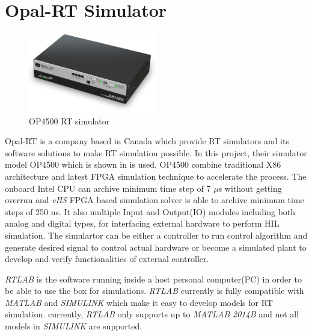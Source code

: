 \section{Opal-RT Simulator}
\begin{figure}[b]
     \centering
     \includegraphics[width = 0.5\textwidth]{figures/op4500.jpg}
     \caption{OP4500 \gls{RT} simulator}
     \label{fig:op4500}
\end{figure}
Opal-RT is a company based in Canada which provide \gls{RT} simulators and its software solutions to make \gls{RT} simulation possible. In this project, their simulator model OP4500 which is shown in  is used. OP4500 combine traditional X86 architecture and latest \gls{FPGA} simulation technique to accelerate the process. The onboard Intel CPU can archive minimum time step of 7 $\mu
$s without getting overrun and \textit{eHS} \gls{FPGA} based simulation solver is able to archive minimum time steps of 250 ns. It also multiple Input and Output(IO) modules including both analog and digital types, for interfacing external hardware to perform \gls{HIL} simulation. The simulartor can be either a controller to run control algorithm and generate desired signal to control actual hardware or become a simulated plant to develop and verify functionalities of external controller. 

\textit{RTLAB} is the software running inside a host personal computer(PC) in order to be able to use the box for simulations. \textit{RTLAB} currently is fully compatible with \textit{MATLAB} and \textit{SIMULINK} which make it easy to develop models for \gls{RT} simulation. currently, \textit{RTLAB} only supports up to \textit{MATLAB 2014B} and not all models in \textit{SIMULINK} are supported. 

